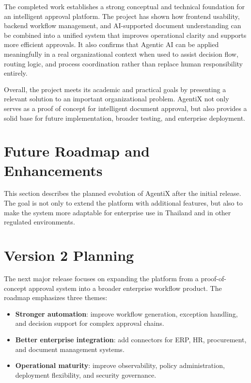\documentclass[12pt,oneside,openright,a4paper]{cpe-english-project}
\begin{document}
The completed work establishes a strong conceptual and technical foundation for an intelligent approval platform. The project has shown how frontend usability, backend workflow management, and AI-supported document understanding can be combined into a unified system that improves operational clarity and supports more efficient approvals. It also confirms that Agentic AI can be applied meaningfully in a real organizational context when used to assist decision flow, routing logic, and process coordination rather than replace human responsibility entirely.

Overall, the project meets its academic and practical goals by presenting a relevant solution to an important organizational problem. AgentiX not only serves as a proof of concept for intelligent document approval, but also provides a solid base for future implementation, broader testing, and enterprise deployment.

\section{Future Roadmap and Enhancements}

This section describes the planned evolution of AgentiX after the initial release. The goal is not only to extend the platform with additional features, but also to make the system more adaptable for enterprise use in Thailand and in other regulated environments.

\section{Version 2 Planning}

The next major release focuses on expanding the platform from a proof-of-concept approval system into a broader enterprise workflow product. The roadmap emphasizes three themes:

\begin{itemize}
  \item \textbf{Stronger automation}: improve workflow generation, exception handling, and decision support for complex approval chains.
  \item \textbf{Better enterprise integration}: add connectors for ERP, HR, procurement, and document management systems.
  \item \textbf{Operational maturity}: improve observability, policy administration, deployment flexibility, and security governance.
\end{itemize}
\end{document}
